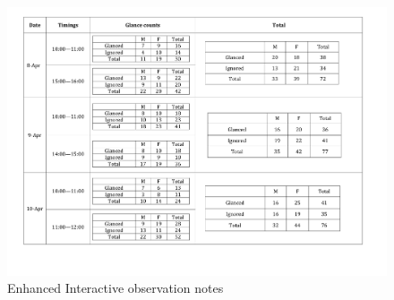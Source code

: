\begin{appendices}
\begin{figure}[H]
 \centering 
    \includegraphics[width=\textwidth,height=0.5\textheight]{Appendices/9/new_body_glance.pdf}
    \caption{Enhanced Interactive observation notes}
     \label{app:fileandfolders}%
\end{figure}



\end{appendices}
